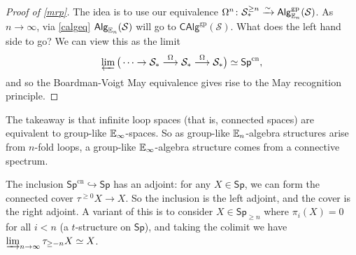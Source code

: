    \begin{proof}[Proof of \cref{mrp}]
       The idea is to use our equivalence $\Omega^n \colon \mathcal{S} _*^{\geq n} \xrightarrow{\sim} \mathsf{Alg}^{\mathrm{gp}} _{\mathbb{E}_n }(\mathcal{S} )$. As $n \to \infty$, via \cref{calgeq} $\mathsf{Alg}_{\mathbb{E}_n }(\mathcal{S} )$ will go to $\mathsf{CAlg}^{\mathrm{gp}} (\mathcal{S} )$. What does the left hand side to go? We can view this as the limit \[
           \varprojlim \big( \cdots \to \mathcal{S} _* \overset{\Omega}{\longrightarrow} \mathcal{S} _* \overset{\Omega}{\longrightarrow}\mathcal{S} _* \big) \simeq \mathsf{Sp}^{\mathrm{cn}} ,
       \] and so the Boardman-Voigt May equivalence gives rise to the May recognition principle.
\end{proof}
The takeaway is that infinite loop spaces (that is, connected spaces) are equivalent to group-like $\mathbb{E}_{\infty}$-spaces. So as group-like $\mathbb{E}_n $-algebra structures arise from $n$-fold loops, a group-like $\mathbb{E}_{\infty }$-algebra structure comes from a connective spectrum.

The inclusion $\mathsf{Sp} ^{\mathrm{cn}}\hookrightarrow  \mathsf{Sp} $ has an adjoint: for any $X \in \mathsf{Sp} $, we can form the connected cover $\tau ^{\geq 0}X \to X$. So the inclusion is the left adjoint, and the cover is the right adjoint. A variant of this is to consider $X \in \mathsf{Sp} _{\geq n}$ where $\pi_i (X)=0$ for all $i<n$ (a $t$-structure on $\mathsf{Sp} $), and taking the colimit we have $\varinjlim _{n \to \infty}\tau _{\geq -n}X \simeq X$.

